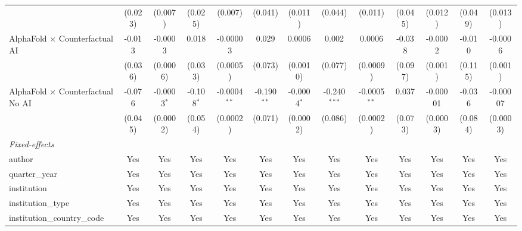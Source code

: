 \begin{tabular}{lcccccccccccc}
                                            & (0.023)       & (0.007)       & (0.025)       & (0.007)        & (0.041)       & (0.011)       & (0.044)        & (0.011)        & (0.045) & (0.012)  & (0.049)      & (0.013)\\   
   AlphaFold $\times$ Counterfactual AI     & -0.013        & -0.0003       & 0.018         & -0.00003       & 0.029         & 0.0006        & 0.002          & 0.0006         & -0.038  & -0.0002  & -0.010       & -0.0006\\   
                                            & (0.036)       & (0.0006)      & (0.033)       & (0.0005)       & (0.073)       & (0.0010)      & (0.077)        & (0.0009)       & (0.097) & (0.001)  & (0.115)      & (0.001)\\   
   AlphaFold $\times$ Counterfactual No AI  & -0.076        & -0.0003$^{*}$ & -0.108$^{*}$  & -0.0004$^{**}$ & -0.190$^{**}$ & -0.0004$^{*}$ & -0.240$^{***}$ & -0.0005$^{**}$ & 0.037   & -0.00001 & -0.036       & -0.00007\\   
                                            & (0.045)       & (0.0002)      & (0.054)       & (0.0002)       & (0.071)       & (0.0002)      & (0.086)        & (0.0002)       & (0.073) & (0.0003) & (0.084)      & (0.0003)\\   
   \midrule
   \emph{Fixed-effects}\\
   author                                   & Yes           & Yes           & Yes           & Yes            & Yes           & Yes           & Yes            & Yes            & Yes     & Yes      & Yes          & Yes\\  
   quarter\_year                            & Yes           & Yes           & Yes           & Yes            & Yes           & Yes           & Yes            & Yes            & Yes     & Yes      & Yes          & Yes\\  
   institution                              & Yes           & Yes           & Yes           & Yes            & Yes           & Yes           & Yes            & Yes            & Yes     & Yes      & Yes          & Yes\\  
   institution\_type                        & Yes           & Yes           & Yes           & Yes            & Yes           & Yes           & Yes            & Yes            & Yes     & Yes      & Yes          & Yes\\  
   institution\_country\_code               & Yes           & Yes           & Yes           & Yes            & Yes           & Yes           & Yes            & Yes            & Yes     & Yes      & Yes          & Yes\\  

\end{tabular}
